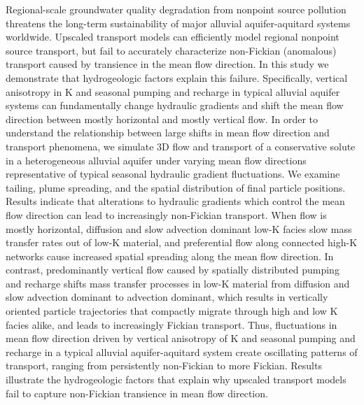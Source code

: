 \noindent Regional-scale groundwater quality degradation from nonpoint source pollution threatens the long-term %
sustainability of major alluvial aquifer-aquitard systems worldwide. Upscaled transport models can efficiently model regional nonpoint source transport, but fail to accurately characterize non-Fickian (anomalous) transport caused by transience in the mean flow direction. %
In this study we demonstrate that hydrogeologic factors explain this failure. Specifically, vertical anisotropy in K and seasonal pumping and recharge in typical alluvial aquifer systems can %
fundamentally change hydraulic gradients and shift the mean flow direction between mostly horizontal and mostly vertical flow. In order to understand the relationship between large shifts in mean flow direction and transport phenomena, we simulate 3D flow and transport of a conservative solute in a heterogeneous alluvial aquifer under varying mean flow directions representative of typical seasonal hydraulic gradient fluctuations. We examine tailing, plume spreading, and the spatial distribution of final particle positions. Results indicate that alterations to hydraulic gradients which control the mean flow direction can lead to increasingly non-Fickian transport. %
When flow is mostly horizontal, diffusion and slow advection dominant low-K facies slow mass transfer rates out of low-K material, and preferential flow along connected high-K networks cause increased spatial spreading along the mean flow direction. In contrast, %
predominantly vertical flow caused by spatially distributed pumping and recharge shifts mass transfer processes in low-K material from diffusion and slow advection dominant to advection dominant, which results in vertically oriented particle trajectories that compactly migrate through high and low K facies alike, and leads to increasingly Fickian transport. Thus, fluctuations in mean flow direction driven by vertical anisotropy of K and seasonal pumping and recharge in a typical alluvial aquifer-aquitard system create oscillating patterns of transport, ranging from persistently non-Fickian to more Fickian. Results %
illustrate the hydrogeologic factors that explain why upscaled transport models fail to capture non-Fickian transience in mean flow direction.

